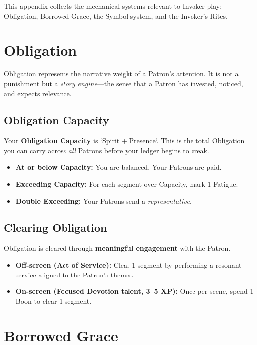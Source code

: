 This appendix collects the mechanical systems relevant to Invoker play: Obligation, Borrowed Grace, the Symbol system, and the Invoker's Rites.

\section{Obligation}
\label{app:obligation}

Obligation represents the narrative weight of a Patron's attention. It is not a punishment but a \emph{story engine}---the sense that a Patron has invested, noticed, and expects relevance.

\subsection{Obligation Capacity}

Your \textbf{Obligation Capacity} is `Spirit + Presence`. This is the total Obligation you can carry across \emph{all} Patrons before your ledger begins to creak.

\begin{itemize}
  \item \textbf{At or below Capacity:} You are balanced. Your Patrons are paid.
  \item \textbf{Exceeding Capacity:} For each segment over Capacity, mark 1 Fatigue.
  \item \textbf{Double Exceeding:} Your Patrons send a \emph{representative}.
\end{itemize}

\subsection{Clearing Obligation}

Obligation is cleared through \textbf{meaningful engagement} with the Patron.

\begin{itemize}
  \item \textbf{Off-screen (Act of Service):} Clear 1 segment by performing a resonant service aligned to the Patron's themes.
  \item \textbf{On-screen (Focused Devotion talent, 3--5 XP):} Once per scene, spend 1 Boon to clear 1 segment.
\end{itemize}

\section{Borrowed Grace}
\label{app:borrowed-grace}

